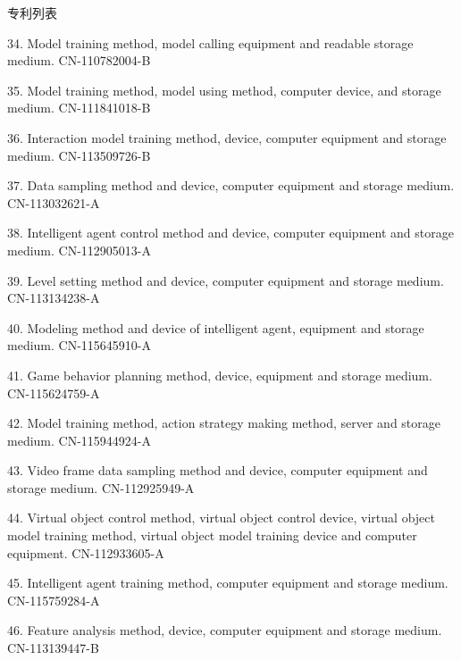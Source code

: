 \documentclass[UTF8]{cv_professional-cn} %
\makeatletter
\newlength{\bibhang}
\newlength{\bibsep}
 {\@listi \global\bibsep\itemsep \global\advance\bibsep by\parsep}
\newenvironment{bibsection}%
        {\vspace{\itemsep}\begin{list}{}{%
       \setlength{\leftmargin}{\bibhang}%
       \setlength{\itemsep}{\bibsep}%
       \setlength{\parsep}{\z@}%
        \setlength{\partopsep}{0pt}%
        \setlength{\topsep}{0pt}}}
        {\end{list}\vspace{\itemsep}}
\makeatother
\begin{document}
\begin{rSection}{专利列表}
\begin{bibsection}
  \item[34.] Model training method, model calling equipment and readable storage medium. CN-110782004-B
  \item[35.] Model training method, model using method, computer device, and storage medium. CN-111841018-B
  \item[36.] Interaction model training method, device, computer equipment and storage medium. CN-113509726-B
  \item[37.] Data sampling method and device, computer equipment and storage medium. CN-113032621-A
  \item[38.] Intelligent agent control method and device, computer equipment and storage medium. CN-112905013-A
  \item[39.] Level setting method and device, computer equipment and storage medium. CN-113134238-A
  \item[40.] Modeling method and device of intelligent agent, equipment and storage medium. CN-115645910-A
  \item[41.] Game behavior planning method, device, equipment and storage medium. CN-115624759-A
  \item[42.] Model training method, action strategy making method, server and storage medium. CN-115944924-A
  \item[43.] Video frame data sampling method and device, computer equipment and storage medium. CN-112925949-A
  \item[44.] Virtual object control method, virtual object control device, virtual object model training method, virtual object model training device and computer equipment. CN-112933605-A
  \item[45.] Intelligent agent training method, computer equipment and storage medium. CN-115759284-A
  \item[46.] Feature analysis method, device, computer equipment and storage medium. CN-113139447-B
\end{bibsection}

\end{rSection}
\end{document}
